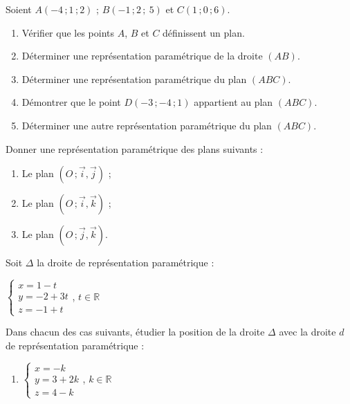 \documentclass{cornouaille}
\begin{document}
\begin{colonne*exercice}

\begin{exercice}
  Soient $A(-4\,;1\,; 2)$ ; $B(-1\,; 2\,;\ 5)$ et $C(1\,; 0 \,; 6)$.
  \begin{enumerate}
  \item Vérifier que les points $A$, $B$ et $C$ définissent un plan.
  \item Déterminer une représentation paramétrique de la droite
    $(AB)$.
  \item Déterminer une représentation paramétrique du plan $(ABC)$.
  \item Démontrer que le point $D(-3\,;-4\,;1)$ appartient au plan
    $(ABC)$.
  \item Déterminer une autre représentation paramétrique du plan
    $(ABC)$.
  \end{enumerate}
\end{exercice}

\begin{exercice}
  Donner une représentation paramétrique des plans suivants :
  \begin{enumerate}
  \item Le plan $(O\,;\overrightarrow{i},\overrightarrow{j})$ ;
  \item Le plan $(O\,;\overrightarrow{i},\overrightarrow{k})$ ;
  \item Le plan $(O\,;\overrightarrow{j},\overrightarrow{k})$.
  \end{enumerate}
\end{exercice}
 
\begin{exercice*}\label{ex52G2}
  Soit $\Delta$ la droite de représentation paramétrique :

  \begin{center}
    $\begin{cases}x=1-t \\y=-2+3t \\z=-1+t \end{cases}$,
    $t\in\mathbb{R}$
  \end{center}

  Dans chacun des cas suivants, étudier la position de la droite
  $\Delta$ avec la droite $d$ de représentation paramétrique :
  \begin{enumerate}
  \item \begin{center}
      $\begin{cases}x=-k \\y=3+2k \\z=4-k \end{cases}$,
      $k\in\mathbb{R}$\\[3mm]
    \end{center}


\end{enumerate}
\end{exercice*}
\end{colonne*exercice}
\end{document}
